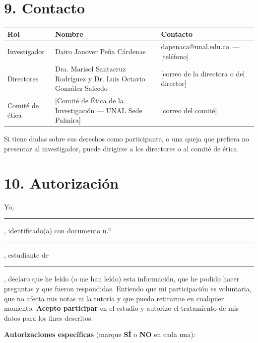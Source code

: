 \documentclass[11pt,letterpaper]{article}
\makeatletter
\newcommand{\Investigador}{Dairo Janover Peña Cárdenas}
\newcommand{\CorreoInv}{dapenaca@unal.edu.co}
\newcommand{\TelInv}{[teléfono]}
\newcommand{\Directores}{Dra. Marisol Santacruz Rodríguez y Dr. Luis Octavio González Salcedo}
\newcommand{\CorreoDir}{[correo de la directora o del director]}
\newcommand{\Comite}{[Comité de Ética de la Investigación --- UNAL Sede Palmira]}
\newcommand{\CorreoComite}{[correo del comité]}
\newcommand{\linea}[1][6cm]{\rule{#1}{0.4pt}}
\makeatother
\begin{document}
\section*{9. Contacto}
\begin{center}
\small
\begin{tabularx}{\linewidth}{@{}p{3cm}p{5.8cm}L@{}}
\toprule
\textbf{Rol} & \textbf{Nombre} & \textbf{Contacto}\\
\midrule
Investigador & \Investigador & \CorreoInv\ --- \TelInv\\
Directores & \Directores & \CorreoDir\\
Comité de ética & \Comite & \CorreoComite\\
\bottomrule
\end{tabularx}
\end{center}
\noindent Si tiene dudas sobre sus derechos como participante, o una queja que prefiera no presentar al investigador, puede dirigirse a los directores o al comité de ética.

\newpage
\section*{10. Autorización}

\noindent Yo, \linea[7.5cm], identificado(a) con documento n.º \linea[4cm], estudiante de \linea[5.5cm], declaro que he leído (o me han leído) esta información, que he podido hacer preguntas y que fueron respondidas. Entiendo que mi participación es voluntaria, que no afecta mis notas ni la tutoría y que puedo retirarme en cualquier momento. \textbf{Acepto participar} en el estudio y autorizo el tratamiento de mis datos para los fines descritos.

\medskip
\noindent\textbf{Autorizaciones específicas} (marque \textbf{SÍ} o \textbf{NO} en cada una):
\end{document}
